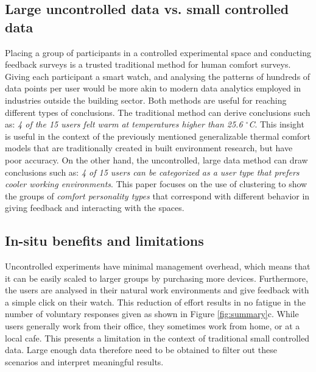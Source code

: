 
\subsection{Large uncontrolled data vs. small controlled data}



Placing a group of participants in a controlled experimental space and conducting feedback surveys is a trusted traditional method for human comfort surveys. Giving each participant a smart watch, and analysing the patterns of hundreds of data points per user would be more akin to modern data analytics employed in industries outside the building sector. Both methods are useful for reaching different types of conclusions. The traditional method can derive conclusions such as: \emph{4 of the 15 users felt warm at temperatures higher than 25.6 $^\circ$C}. This insight is useful in the context of the previously mentioned generalizable thermal comfort models that are traditionally created in built environment research, but have poor accuracy. On the other hand, the uncontrolled, large data method can draw conclusions such as: \emph{4 of 15 users can be categorized as a user type that prefers cooler working environments}. This paper focuses on the use of clustering to show the groups of \emph{comfort personality types} that correspond with different behavior in giving feedback and interacting with the spaces. 



\subsection{In-situ benefits and limitations}
Uncontrolled experiments have minimal management overhead, which means that it can be easily scaled to larger groups by purchasing more devices. Furthermore, the users are analysed in their natural work environments and give feedback with a simple click on their watch. This reduction of effort results in no fatigue in the number of voluntary responses given as shown in Figure \ref{fig:summary}c. While users generally work from their office, they sometimes work from home, or at a local cafe. This presents a limitation in the context of traditional small controlled data. Large enough data therefore need to be obtained to filter out these scenarios and interpret meaningful results.


